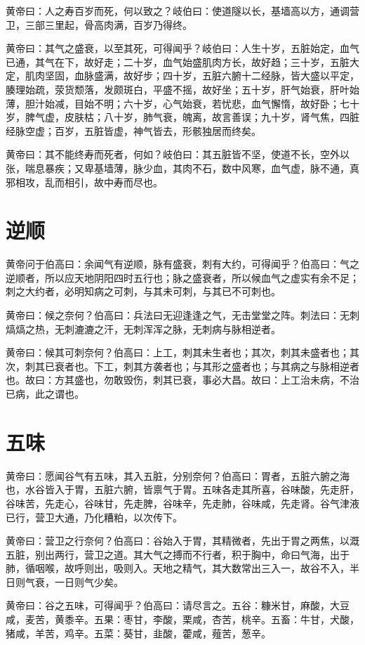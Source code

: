 \documentclass[a4paper,12pt,UTF8,twoside]{ctexbook}
\begin{document}
	黄帝曰：人之寿百岁而死，何以致之？岐伯曰：使道隧以长，基墙高以方，通调营卫，三部三里起，骨高肉满，百岁乃得终。
	
	黄帝曰：其气之盛衰，以至其死，可得闻乎？岐伯曰：人生十岁，五脏始定，血气已通，其气在下，故好走；二十岁，血气始盛肌肉方长，故好趋；三十岁，五脏大定，肌肉坚固，血脉盛满，故好步；四十岁，五脏六腑十二经脉，皆大盛以平定，腠理始疏，荥货颓落，发颇斑白，平盛不摇，故好坐；五十岁，肝气始衰，肝叶始薄，胆汁始减，目始不明；六十岁，心气始衰，若忧悲，血气懈惰，故好卧；七十岁，脾气虚，皮肤枯；八十岁，肺气衰，魄离，故言善误；九十岁，肾气焦，四脏经脉空虚；百岁，五脏皆虚，神气皆去，形骸独居而终矣。
	
	黄帝曰：其不能终寿而死者，何如？岐伯曰：其五脏皆不坚，使道不长，空外以张，喘息暴疾；又卑基墙薄，脉少血，其肉不石，数中风寒，血气虚，脉不通，真邪相攻，乱而相引，故中寿而尽也。
	\chapter{逆顺}
	
	黄帝问于伯高曰：余闻气有逆顺，脉有盛衰，刺有大约，可得闻乎？伯高曰：气之逆顺者，所以应天地阴阳四时五行也；脉之盛衰者，所以候血气之虚实有余不足；刺之大约者，必明知病之可刺，与其未可刺，与其已不可刺也。
	
	黄帝曰：候之奈何？伯高曰：兵法曰无迎逢逢之气，无击堂堂之阵。刺法曰：无刺熇熇之热，无刺漉漉之汗，无刺浑浑之脉，无刺病与脉相逆者。
	
	黄帝曰：候其可刺奈何？伯高曰：上工，刺其未生者也；其次，刺其未盛者也；其次，刺其已衰者也。下工，刺其方袭者也；与其形之盛者也；与其病之与脉相逆者也。故曰：方其盛也，勿敢毁伤，刺其已衰，事必大昌。故曰：上工治未病，不治已病，此之谓也。
	\chapter{五味}
	
	黄帝曰：愿闻谷气有五味，其入五脏，分别奈何？伯高曰：胃者，五脏六腑之海也，水谷皆入于胃，五脏六腑，皆禀气于胃。五味各走其所喜，谷味酸，先走肝，谷味苦，先走心，谷味甘，先走脾，谷味辛，先走肺，谷味咸，先走肾。谷气津液已行，营卫大通，乃化糟粕，以次传下。
	
	黄帝曰：营卫之行奈何？伯高曰：谷始入于胃，其精微者，先出于胃之两焦，以溉五脏，别出两行，营卫之道。其大气之搏而不行者，积于胸中，命曰气海，出于肺，循咽喉，故呼则出，吸则入。天地之精气，其大数常出三入一，故谷不入，半日则气衰，一日则气少矣。
	
	黄帝曰：谷之五味，可得闻乎？伯高曰：请尽言之。五谷：糠米甘，麻酸，大豆咸，麦苦，黄黍辛。五果：枣甘，李酸，栗咸，杏苦，桃辛。五畜：牛甘，犬酸，猪咸，羊苦，鸡辛。五菜：葵甘，韭酸，藿咸，薤苦，葱辛。
	
\end{document}
